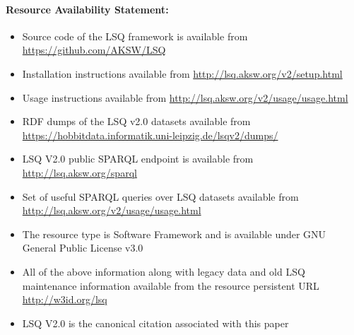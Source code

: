 \paragraph*{Resource Availability Statement:}\label{resource} \begin{itemize}
    \item Source code of the LSQ framework is available from \url{https://github.com/AKSW/LSQ}
    \item Installation instructions available from \url{http://lsq.aksw.org/v2/setup.html}
    \item Usage instructions available from \url{http://lsq.aksw.org/v2/usage/usage.html}
    \item RDF dumps of the LSQ v2.0 datasets available from \url{https://hobbitdata.informatik.uni-leipzig.de/lsqv2/dumps/}
    \item LSQ V2.0 public SPARQL endpoint is available from \url{http://lsq.aksw.org/sparql}
    \item Set of useful SPARQL queries over LSQ datasets available from \url{http://lsq.aksw.org/v2/usage/usage.html}

    \item The resource type is Software Framework
 and is available under GNU General Public License v3.0

    \item All of the above information along with legacy data and old LSQ maintenance information available from the resource persistent URL \url{http://w3id.org/lsq}
    \item LSQ V2.0 \cite{stadleralsq} is the canonical citation associated with this paper 
\end{itemize}




